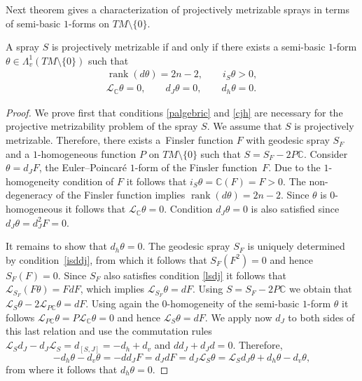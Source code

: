 Next theorem gives a characterization of projectively metrizable sprays in
terms of semi-basic $1$-forms on $TM\setminus\{0\}$.
\begin{Theorem} \label{thm:pm} A spray $S$ is projectively
metrizable if and only if there exists a semi-basic $1$-form
$\theta\in \Lambda^1_v(TM\setminus\{0\})$ such that
\begin{gather}
\operatorname{rank}\left(d\theta\right)=2n-2, \qquad i_S\theta>0,
\label{palgebric} \\ \mathcal{L}_{\mathbb{C}}\theta =0, \qquad
d_J\theta=0, \qquad d_h\theta=0. \label{cjh}\end{gather}
\end{Theorem}
\begin{proof}
We prove f\/irst that conditions \eqref{palgebric} and \eqref{cjh} are
necessary for the projective metri\-za\-bility problem of the spray $S$.
We assume that $S$ is projectively metrizable. Therefore, there
exists a~Finsler function $F$ with geodesic spray $S_F$ and a
$1$-homogeneous function $P$ on $TM\setminus\{0\}$ such that
$S=S_F-2P\mathbb{C}$. Consider $\theta=d_JF$, the Euler--Poincar\'e
$1$-form of the Finsler function~$F$. Due to the $1$-homogeneity
condition of $F$ it follows that $i_S\theta=\mathbb{C}(F)=F>0$. The non-degeneracy
of the Finsler function implies
$\operatorname{rank}\left(d\theta\right)=2n-2$. Since $\theta$ is
$0$-homogeneous it follows that
$\mathcal{L}_{\mathbb{C}}\theta=0$. Condition $d_J\theta=0$ is
also satisf\/ied since $d_J\theta=d_J^2F=0$.

It remains to show that $d_h\theta=0$. The geodesic spray $S_F$ is
uniquely determined by condi\-tion~\eqref{isddj}, from which it
follows that $S_F(F^2)=0$ and hence $S_F(F)=0$. Since $S_F$ also
satis\-f\/ies condition \eqref{lsdj} it follows that
$\mathcal{L}_{S_F}\left(F\theta\right)=FdF$, which implies
$\mathcal{L}_{S_F}\theta=dF$. Using $S=S_F-2P\mathbb{C}$ we obtain
that $\mathcal{L}_{S}\theta -2 \mathcal{L}_{P\mathbb{C}}\theta=dF$.
Using again the $0$-homogeneity of the semi-basic $1$-form $\theta$ it
follows $\mathcal{L}_{P\mathbb{C}}\theta= P
\mathcal{L}_{\mathbb{C}}\theta=0$ and hence
$\mathcal{L}_{S}\theta=dF$. We apply now $d_J$ to both sides of
this last relation and use the commutation rules
$\mathcal{L}_Sd_J-d_J\mathcal{L}_S=d_{[S,J]}=-d_{h}+d_{v}$ and
$dd_J+d_Jd=0.$ Therefore,
\[
-d_h\theta-d_v\theta=-dd_JF=d_JdF=d_J\mathcal{L}_{S}\theta=
\mathcal{L}_Sd_J\theta + d_{h}\theta- d_{v}\theta,
\] from where
it follows that $d_h\theta=0$.


\end{proof}
